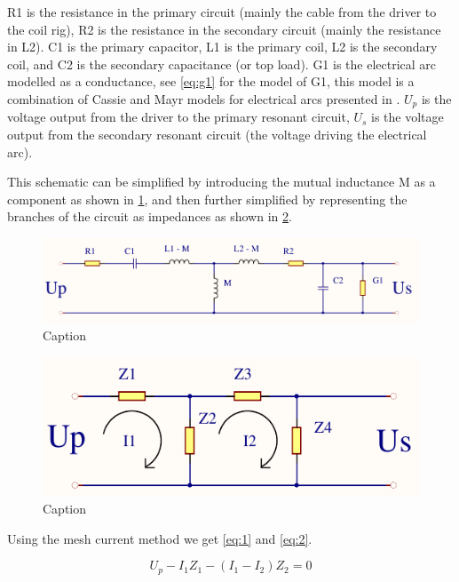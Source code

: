 R1 is the resistance in the primary circuit (mainly the cable from the driver to the coil rig), R2 is the resistance in the secondary circuit (mainly the resistance in L2). C1 is the primary capacitor, L1 is the primary coil, L2 is the secondary coil, and C2 is the secondary capacitance (or top load). G1 is the electrical arc modelled as a conductance, see \cref{eq:g1} for the model of G1, this model is a combination of Cassie \citep{cassie} and Mayr \citep{mayr} models for electrical arcs presented in \citep{575670}. $U_p$ is the voltage output from the driver to the primary resonant circuit, $U_s$ is the voltage output from the secondary resonant circuit (the voltage driving the electrical arc).

This schematic can be simplified by introducing the mutual inductance M as a component as shown in \cref{fig:spolerigg2}, and then further simplified by representing the branches of the circuit as impedances as shown in \cref{fig:spolerigg3}.

\begin{figure}[h!]
    \centering
    \includegraphics[width=\textwidth]{Skjema/Spolerigg2.pdf}
    \caption{Caption}
    \label{fig:spolerigg2}
\end{figure}

\begin{figure}[h!]
    \centering
    \includegraphics[width=\textwidth]{Skjema/Spolerigg3.pdf}
    \caption{Caption}
    \label{fig:spolerigg3}
\end{figure}

Using the mesh current method we get \cref{eq:1} and \cref{eq:2}.

\begin{equation} \label{eq:1}
    U_p - I_1 Z_1 - (I_1 - I_2) Z_2 = 0
\end{equation}

